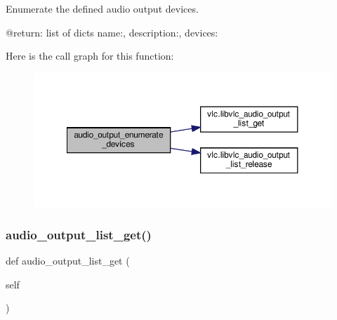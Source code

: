 \begin{DoxyVerb}Enumerate the defined audio output devices.

@return: list of dicts {name:, description:, devices:}
\end{DoxyVerb}
 Here is the call graph for this function\+:
\nopagebreak
\begin{figure}[H]
\begin{center}
\leavevmode
\includegraphics[width=350pt]{classvlc_1_1_instance_a6fdfa4effb01d9a1ebfde60527f7508b_cgraph}
\end{center}
\end{figure}
\mbox{\label{classvlc_1_1_instance_a3f066d48b8d8447cc7c5461e69187969}} 
\subsubsection{\texorpdfstring{audio\+\_\+output\+\_\+list\+\_\+get()}{audio\_output\_list\_get()}}
{\footnotesize\ttfamily def audio\+\_\+output\+\_\+list\+\_\+get (\begin{DoxyParamCaption}\item[{}]{self }\end{DoxyParamCaption})}

